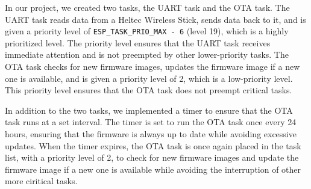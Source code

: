 In our project, we created two tasks, the UART task and the OTA task. The UART task reads data from a Heltec Wireless Stick, sends data back to it, and is given a priority level of \texttt{ESP\_TASK\_PRIO\_MAX - 6} (level 19), which is a highly prioritized level. The priority level ensures that the UART task receives immediate attention and is not preempted by other lower-priority tasks. The OTA task checks for new firmware images, updates the firmware image if a new one is available, and is given a priority level of 2, which is a low-priority level. This priority level ensures that the OTA task does not preempt critical tasks.

In addition to the two tasks, we implemented a timer to ensure that the OTA task runs at a set interval. The timer is set to run the OTA task once every 24 hours, ensuring that the firmware is always up to date while avoiding excessive updates. When the timer expires, the OTA task is once again placed in the task list, with a priority level of 2, to check for new firmware images and update the firmware image if a new one is available while avoiding the interruption of other more ciritical tasks.